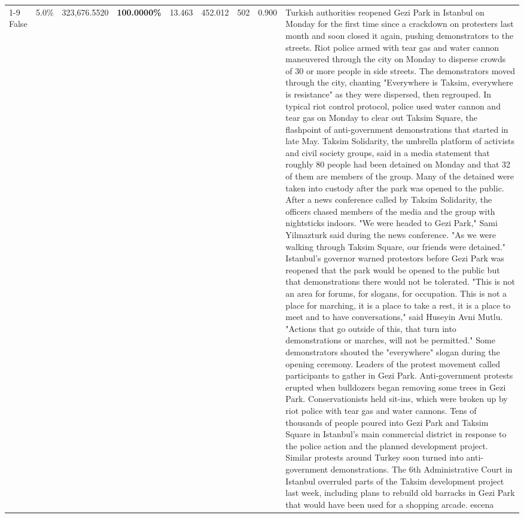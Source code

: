 \begin{table}[H]
\begin{tabular}{lllrlllll}
\cline{1-9}
False & 5.0\% & 323,676.5520 & \bfseries \color{red} 100.0000\% & 13.463 & 452.012 & 502 & 0.900 & Turkish authorities reopened Gezi Park in Istanbul on Monday for the first time since a crackdown on protesters last month and soon closed it again, pushing demonstrators to the streets. Riot police armed with tear gas and water cannon maneuvered through the city on Monday to disperse crowds of 30 or more people in side streets. The demonstrators moved through the city, chanting "Everywhere is Taksim, everywhere is resistance" as they were dispersed, then regrouped. In typical riot control protocol, police used water cannon and tear gas on Monday to clear out Taksim Square, the flashpoint of anti-government demonstrations that started in late May. Taksim Solidarity, the umbrella platform of activists and civil society groups, said in a media statement that roughly 80 people had been detained on Monday and that 32 of them are members of the group. Many of the detained were taken into custody after the park was opened to the public. After a news conference called by Taksim Solidarity, the officers chased members of the media and the group with nightsticks indoors. "We were headed to Gezi Park," Sami Yilmazturk said during the news conference. "As we were walking through Taksim Square, our friends were detained." Istanbul's governor warned protestors before Gezi Park was reopened that the park would be opened to the public but that demonstrations there would not be tolerated. "This is not an area for forums, for slogans, for occupation. This is not a place for marching, it is a place to take a rest, it is a place to meet and to have conversations," said Huseyin Avni Mutlu. "Actions that go outside of this, that turn into demonstrations or marches, will not be permitted." Some demonstrators shouted the "everywhere" slogan during the opening ceremony. Leaders of the protest movement called participants to gather in Gezi Park. Anti-government protests erupted when bulldozers began removing some trees in Gezi Park. Conservationists held sit-ins, which were broken up by riot police with tear gas and water cannons. Tens of thousands of people poured into Gezi Park and Taksim Square in Istanbul's main commercial district in response to the police action and the planned development project. Similar protests around Turkey soon turned into anti-government demonstrations. The 6th Administrative Court in Istanbul overruled parts of the Taksim development project last week, including plans to rebuild old barracks in Gezi Park that would have been used for a shopping arcade. escena \\

\end{tabular}
\end{table}
